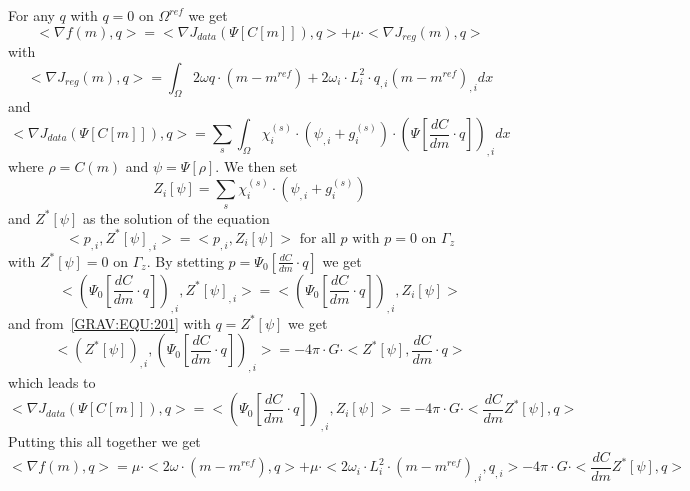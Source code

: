 For any $q$ with $q=0$ on $\Omega^{ref}$ we get 
\begin{equation}\label{GRAV:EQU:202}
< \nabla f(m),q> = < \nabla J_{data}(\Psi[C[m]]), q>  +  \mu \cdot < \nabla J_{reg}(m),q>
\end{equation} 
with 
\begin{equation}\label{GRAV:EQU:202a}
< \nabla J_{reg}(m),q> = 
\int_{\Omega} 2 \omega q \cdot (m-m^{ref}) + 2 \omega_i \cdot L_i^2 \cdot q_{,i} (m-m^{ref})_{,i} dx
\end{equation} 
and 
\begin{equation}\label{GRAV:EQU:202b}
< \nabla J_{data}(\Psi[C[m]]), q> = 
\sum_{s} \int_{\Omega} \chi^{(s)}_i \cdot (  \psi_{,i} +  g^{(s)}_i)  \cdot (\Psi[\frac{dC}{dm} \cdot q])_{,i} dx 
\end{equation} 
where $\rho=C(m)$ and $\psi=\Psi[\rho]$. We then set 
\begin{equation}\label{GRAV:EQU:202c}
Z_i[\psi]= \sum_{s} \chi^{(s)}_i \cdot (  \psi_{,i} +  g^{(s)}_i) 
\end{equation} 
and $Z^*[\psi]$ as the solution of the equation 
\begin{equation}\label{GRAV:EQU:202d}
< p_{,i},Z^*[\psi]_{,i} > =  < p_{,i} ,Z_i[\psi] > \mbox{ for all } p \mbox{ with } p=0 \mbox{ on } \Gamma_{z}
\end{equation} 
with $Z^*[\psi]=0$ on $\Gamma_{z}$. By stetting $p=\Psi_0[\frac{dC}{dm} \cdot q]$ we get
\begin{equation}\label{GRAV:EQU:202e}
<(\Psi_0[\frac{dC}{dm} \cdot q]) _{,i},Z^*[\psi]_{,i} > =  < (\Psi_0[\frac{dC}{dm} \cdot q])_{,i} ,Z_i[\psi] >
\end{equation} 
and from~\ref{GRAV:EQU:201} with $q=Z^*[\psi]$ we get
\begin{equation}\label{GRAV:EQU:20e}
< (Z^*[\psi])_{,i},(\Psi_0[\frac{dC}{dm} \cdot q])_{,i} > = - 4\pi \cdot G \cdot  < Z^*[\psi], \frac{dC}{dm} \cdot q >
\end{equation}
which leads to 
\begin{equation}\label{GRAV:EQU:202f}
< \nabla J_{data}(\Psi[C[m]]), q> = < (\Psi_0[\frac{dC}{dm} \cdot q])_{,i} ,Z_i[\psi] > 
=  - 4\pi \cdot G \cdot  < \frac{dC}{dm} Z^*[\psi] , q > 
\end{equation} 
Putting this all together we get
\begin{equation}\label{GRAV:EQU:202g}
< \nabla f(m),q> = 
\mu \cdot < 2 \omega \cdot (m-m^{ref}), q>
+ \mu \cdot < 2 \omega_i \cdot L_i^2 \cdot (m-m^{ref})_{,i}, q_{,i}> - 4\pi \cdot G \cdot  < \frac{dC}{dm} Z^*[\psi] , q > 
\end{equation}  

